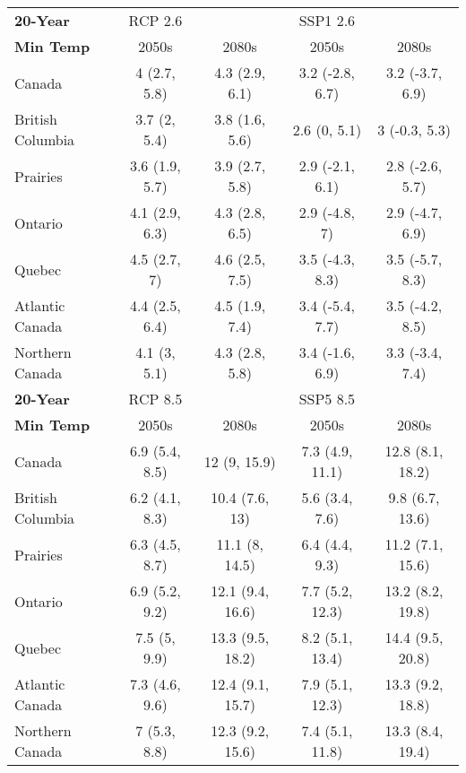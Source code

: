 \documentclass[]{scrartcl}
\begin{document}
\begin{table}[t]
\begin{center}
\begin{tabularx}{\linewidth}{|L|cc|cc|}
			\hline
			\hline
			\textbf{20-Year} & RCP 2.6 & & SSP1 2.6 &   \\
			\textbf{Min Temp} & 2050s & 2080s & 2050s &2080s \\
			\hline
			Canada & 4 (2.7, 5.8) & 4.3 (2.9, 6.1) & 3.2 (-2.8, 6.7) & 3.2 (-3.7, 6.9) \\ 
			British Columbia & 3.7 (2, 5.4) & 3.8 (1.6, 5.6) & 2.6 (0, 5.1) & 3 (-0.3, 5.3) \\ 
			Prairies & 3.6 (1.9, 5.7) & 3.9 (2.7, 5.8) & 2.9 (-2.1, 6.1) & 2.8 (-2.6, 5.7) \\ 
			Ontario & 4.1 (2.9, 6.3) & 4.3 (2.8, 6.5) & 2.9 (-4.8, 7) & 2.9 (-4.7, 6.9) \\ 
			Quebec & 4.5 (2.7, 7) & 4.6 (2.5, 7.5) & 3.5 (-4.3, 8.3) & 3.5 (-5.7, 8.3) \\ 
			Atlantic Canada & 4.4 (2.5, 6.4) & 4.5 (1.9, 7.4) & 3.4 (-5.4, 7.7) & 3.5 (-4.2, 8.5) \\ 
			Northern Canada & 4.1 (3, 5.1) & 4.3 (2.8, 5.8) & 3.4 (-1.6, 6.9) & 3.3 (-3.4, 7.4) \\ 
			\hline
			\textbf{20-Year} & RCP 8.5 & & SSP5 8.5 &   \\
			\textbf{Min Temp} & 2050s & 2080s & 2050s &2080s \\
			\hline
			Canada & 6.9 (5.4, 8.5) & 12 (9, 15.9) & 7.3 (4.9, 11.1) & 12.8 (8.1, 18.2) \\ 
			British Columbia & 6.2 (4.1, 8.3) & 10.4 (7.6, 13) & 5.6 (3.4, 7.6) & 9.8 (6.7, 13.6) \\ 
			Prairies & 6.3 (4.5, 8.7) & 11.1 (8, 14.5) & 6.4 (4.4, 9.3) & 11.2 (7.1, 15.6) \\ 
			Ontario & 6.9 (5.2, 9.2) & 12.1 (9.4, 16.6) & 7.7 (5.2, 12.3) & 13.2 (8.2, 19.8) \\ 
			Quebec & 7.5 (5, 9.9) & 13.3 (9.5, 18.2) & 8.2 (5.1, 13.4) & 14.4 (9.5, 20.8) \\ 
			Atlantic Canada & 7.3 (4.6, 9.6) & 12.4 (9.1, 15.7) & 7.9 (5.1, 12.3) & 13.3 (9.2, 18.8) \\ 
			Northern Canada & 7 (5.3, 8.8) & 12.3 (9.2, 15.6) & 7.4 (5.1, 11.8) & 13.3 (8.4, 19.4) \\ 
			\hline	
		\end{tabularx}
	\end{center}
\end{table}

\end{document}
